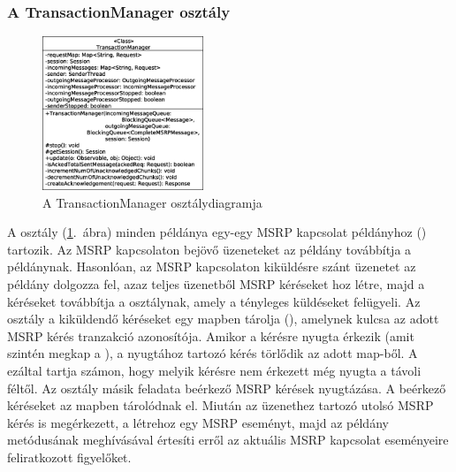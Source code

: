 \subsubsection*{A TransactionManager osztály}
\label{sec:msrp_transactionmanager}

\begin{figure}
  \vspace{-25pt}
  \begin{center}
    \includegraphics[width=0.43\textwidth]{img/class_diagrams/TransactionManager.eps}
  \end{center}
  \vspace{-15pt}
  \captionsetup{font=scriptsize}
  \caption{A TransactionManager osztálydiagramja}
   \label{fig:class_transactionmanager}
  \vspace{-10pt}
\end{figure}
A  osztály (\ref{fig:class_transactionmanager}.~ábra) minden példánya egy-egy MSRP kapcsolat példányhoz () tartozik. Az MSRP kapcsolaton bejövő üzeneteket az  példány továbbítja a  példánynak. Hasonlóan, az MSRP kapcsolaton kiküldésre szánt üzenetet az  példány dolgozza fel, azaz teljes üzenetből MSRP kéréseket hoz létre, majd a kéréseket továbbítja a  osztálynak, amely a tényleges küldéseket felügyeli. Az osztály a kiküldendő kéréseket egy mapben tárolja (), amelynek kulcsa az adott MSRP kérés tranzakció azonosítója. Amikor a kérésre nyugta érkezik (amit szintén megkap a ), a nyugtához tartozó kérés törlődik az adott map-ből. A  ezáltal tartja számon, hogy melyik kérésre nem érkezett még nyugta a távoli féltől. Az osztály másik feladata beérkező MSRP kérések nyugtázása. A beérkező kéréseket az  mapben tárolódnak el. Miután az üzenethez tartozó utolsó MSRP kérés is megérkezett, a  létrehoz egy MSRP eseményt, majd az  példány  metódusának meghívásával értesíti erről az aktuális MSRP kapcsolat eseményeire feliratkozott figyelőket.

